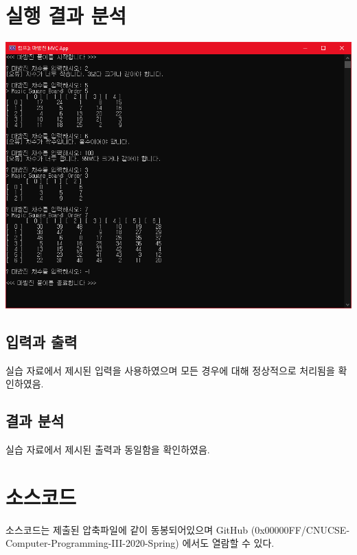 \documentclass[UTF8]{report}
\begin{document}
    \chapter{실행 결과 분석}
        \includegraphics[width=\textwidth]{test_result.png}
        \section{입력과 출력}
            실습 자료에서 제시된 입력을 사용하였으며 모든 경우에 대해 정상적으로 처리됨을 확인하였음.
        \section{결과 분석}
            실습 자료에서 제시된 출력과 동일함을 확인하였음.

    \chapter{소스코드}
        소스코드는 제출된 압축파일에 같이 동봉되어있으며 GitHub (0x00000FF/CNUCSE-Computer-Programming-III-2020-Spring) 에서도 열람할 수 있다.
\end{document}
